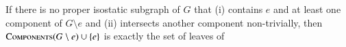 \begin{observation}
     If there is no proper isostatic subgraph of $G$ that (i) contains $e$ and at least one component of $G\setminus e$ and (ii) intersects another component non-trivially, then $\textsc{Components}(G\setminus e)\cup \{ e\}$ is exactly the set of leaves of \branchGePG\
\end{observation}



\ClearMyMinHeight
{}

